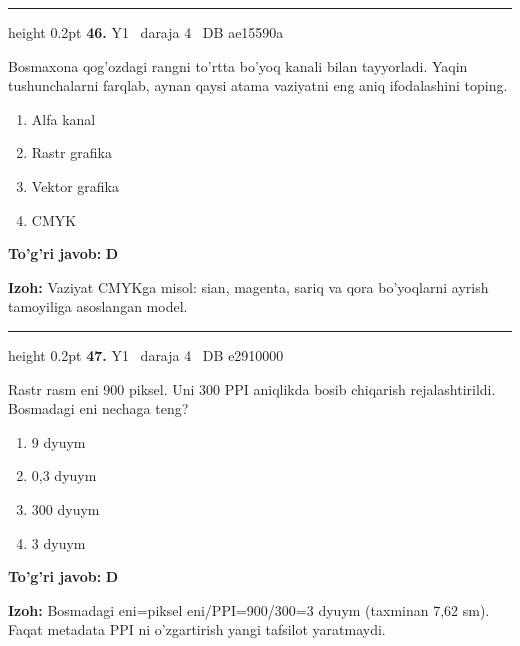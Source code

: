 \documentclass[10pt,a4paper,oneside]{article}
\begin{document}
\vspace{2mm}\hrule height 0.2pt \vspace{4mm}
\hypertarget{q46}{\textbf{\color{ink}46.}}  {\color{muted}\scriptsize Y1 \textbullet\ daraja 4 \textbullet\ DB ae15590a}
\par
Bosmaxona qog'ozdagi rangni to'rtta bo'yoq kanali bilan tayyorladi. Yaqin tushunchalarni farqlab, aynan qaysi atama vaziyatni eng aniq ifodalashini toping.
\begin{enumerate}[label=\Alph*),leftmargin=9mm]
\item Alfa kanal
\item Rastr grafika
\item Vektor grafika
\item CMYK
\end{enumerate}
\begin{tcolorbox}[enhanced,breakable,colback=teal!4,colframe=teal!45!black,boxrule=0.45pt,arc=1.2mm,left=2.8mm,right=2.8mm,top=2mm,bottom=2mm,before skip=2mm,after skip=2mm]
\textbf{\color{teal}To'g'ri javob:} \textbf{D}
\par\smallskip
\textbf{Izoh:} Vaziyat CMYKga misol: sian, magenta, sariq va qora bo'yoqlarni ayrish tamoyiliga asoslangan model.
\end{tcolorbox}
\vspace{2mm}\hrule height 0.2pt \vspace{4mm}
\hypertarget{q47}{\textbf{\color{ink}47.}}  {\color{muted}\scriptsize Y1 \textbullet\ daraja 4 \textbullet\ DB e2910000}
\par
Rastr rasm eni 900 piksel. Uni 300 PPI aniqlikda bosib chiqarish rejalashtirildi. Bosmadagi eni nechaga teng?
\begin{enumerate}[label=\Alph*),leftmargin=9mm]
\item 9 dyuym
\item 0,3 dyuym
\item 300 dyuym
\item 3 dyuym
\end{enumerate}
\begin{tcolorbox}[enhanced,breakable,colback=teal!4,colframe=teal!45!black,boxrule=0.45pt,arc=1.2mm,left=2.8mm,right=2.8mm,top=2mm,bottom=2mm,before skip=2mm,after skip=2mm]
\textbf{\color{teal}To'g'ri javob:} \textbf{D}
\par\smallskip
\textbf{Izoh:} Bosmadagi eni=piksel eni/PPI=900/300=3 dyuym (taxminan 7,62 sm). Faqat metadata PPI ni o'zgartirish yangi tafsilot yaratmaydi.
\end{tcolorbox}
\end{document}
